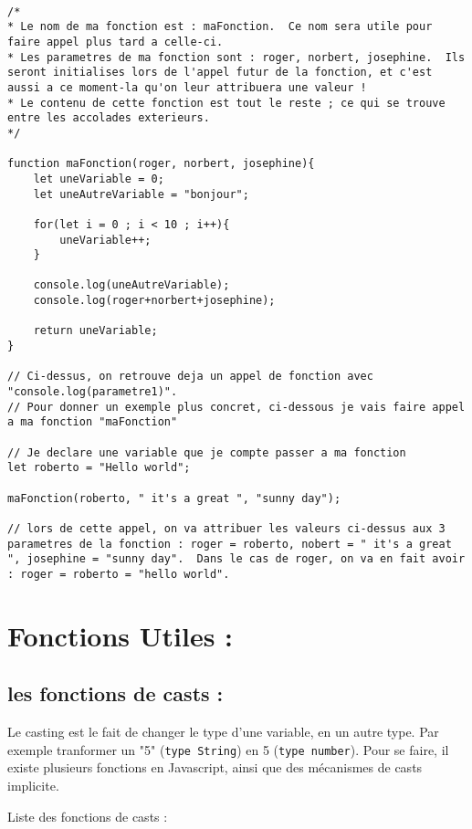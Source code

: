 \documentclass[a4paper, 11pt]{scrartcl}
\begin{document}
\begin{lstlisting}

/*
* Le nom de ma fonction est : maFonction.  Ce nom sera utile pour faire appel plus tard a celle-ci.
* Les parametres de ma fonction sont : roger, norbert, josephine.  Ils seront initialises lors de l'appel futur de la fonction, et c'est aussi a ce moment-la qu'on leur attribuera une valeur !
* Le contenu de cette fonction est tout le reste ; ce qui se trouve entre les accolades exterieurs.
*/

function maFonction(roger, norbert, josephine){
	let uneVariable = 0;
	let uneAutreVariable = "bonjour";
	
	for(let i = 0 ; i < 10 ; i++){
		uneVariable++;	
	}
	
	console.log(uneAutreVariable);
	console.log(roger+norbert+josephine);
	
	return uneVariable;
}

// Ci-dessus, on retrouve deja un appel de fonction avec "console.log(parametre1)".
// Pour donner un exemple plus concret, ci-dessous je vais faire appel a ma fonction "maFonction"

// Je declare une variable que je compte passer a ma fonction
let roberto = "Hello world";

maFonction(roberto, " it's a great ", "sunny day");

// lors de cette appel, on va attribuer les valeurs ci-dessus aux 3 parametres de la fonction : roger = roberto, nobert = " it's a great ", josephine = "sunny day".  Dans le cas de roger, on va en fait avoir : roger = roberto = "hello world".

\end{lstlisting}

\section{Fonctions Utiles : }

\subsection{les fonctions de casts :}

Le casting est le fait de changer le type d'une variable, en un autre type.  Par exemple tranformer un "5" (\texttt{type String}) en 5 (\texttt{type number}).  Pour se faire, il existe plusieurs fonctions en Javascript, ainsi que des mécanismes de casts implicite.  

Liste des fonctions de casts :
\end{document}
